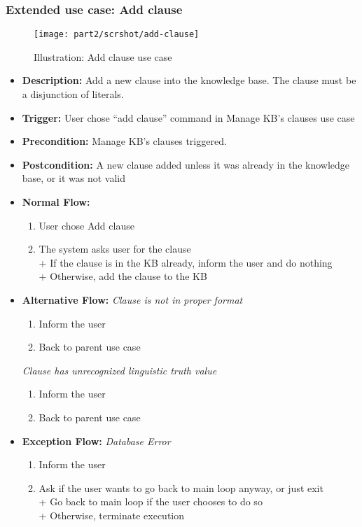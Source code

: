 \documentclass[../gr-final.tex]{subfiles}
\begin{document}
\subsubsection{Extended use case: Add clause}
\begin{figure}[H]
  \centering
  \texttt{[image: part2/scrshot/add-clause]}
  \caption{Illustration: Add clause use case}
\end{figure}
\begin{itemize}
  \item {\bfseries Description:} Add a new clause into the
    knowledge base. The clause must be a disjunction of literals.
  \item {\bfseries Trigger:} User chose ``add clause'' command in
    Manage KB's clauses use case
  \item {\bfseries Precondition:} Manage KB's clauses triggered.
  \item {\bfseries Postcondition:} A new clause added unless it
    was already in the knowledge base, or it was not valid    
  \item {\bfseries Normal Flow:}
    \begin{enumerate}
      \item User chose Add clause
      \item The system asks user for the clause\\
        \indent + If the clause is in the KB already, inform the
        user and do nothing   \\
        \indent + Otherwise, add the clause to the KB        
    \end{enumerate}
  \item {\bfseries Alternative Flow:}
    {\em Clause is not in proper format}
    \begin{enumerate}
      \item Inform the user
      \item Back to parent use case
    \end{enumerate}
    {\em Clause has unrecognized linguistic truth value}
    \begin{enumerate}
      \item Inform the user
      \item Back to parent use case
    \end{enumerate}
  \item {\bfseries Exception Flow:}
    {\em Database Error}
    \begin{enumerate}
      \item Inform the user
      \item Ask if the user wants to go back to main loop anyway,
        or just exit\\
        \indent + Go back to main loop if the user chooses to do
        so\\
        \indent + Otherwise, terminate execution
    \end{enumerate}
\end{itemize}
\end{document}
